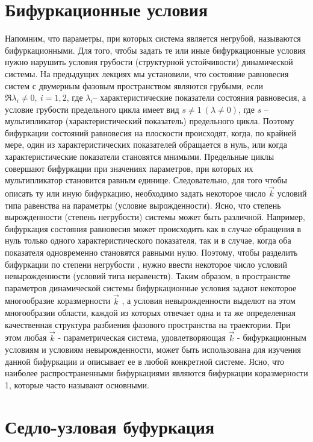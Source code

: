 \section{Бифуркационные условия}%
\label{sec:8.1}

Напомним, что параметры, при которых система является негрубой,
называются бифуркационными. Для того, чтобы задать те или иные
бифуркационные условия нужно нарушить условия грубости (структурной
устойчивости) динамической системы. На предыдущих лекциях мы
установили, что состояние равновесия систем с двумерным фазовым
пространством являются грубыми, если $\Re \lambda_i \neq 0,~ i=1,2$, где $\lambda_i$--
характеристические показатели состояния равновесия, а условие грубости
предельного цикла имеет вид $s\neq 1 ~ (\lambda \neq 0)$, где $s$ – мультипликатор
(характеристический показатель) предельного цикла. Поэтому бифуркации
состояний равновесия на плоскости происходят, когда, по крайней мере, один
из характеристических показателей обращается в нуль, или когда
характеристические показатели становятся мнимыми. Предельные циклы
совершают бифуркации при значениях параметров, при которых их
мультипликатор становится равным единице. Следовательно, для того чтобы
описать ту или иную бифуркацию, необходимо задать некоторое число $\vec k$
условий типа равенства на параметры (условие вырожденности). Ясно, что
степень вырожденности (степень негрубости) системы может быть различной.
Например, бифуркация состояния равновесия может происходить как в случае
обращения в нуль только одного характеристического показателя, так и в
случае, когда оба показателя одновременно становятся равными нулю.
Поэтому, чтобы разделить бифуркации по степени негрубости , нужно ввести
некоторое число условий невырожденности (условий типа неравенств). Таким
образом, в пространстве параметров динамической системы бифуркационные
условия задают некоторое многообразие коразмерности $\vec k$ , а условия
невырожденности выделют на этом многообразии области, каждой из которых
отвечает одна и та же определенная качественная структура разбиения
фазового пространства на траектории. При этом любая $\vec k$ - параметрическая
система, удовлетворяющая $\vec k$ - бифуркационным условиям и условиям
невырожденности, может быть использована для изучения данной бифуркации
и описывает ее в любой конкретной системе. Ясно, что наиболее
распространенными бифуркациями являются бифуркации коразмерности 1,
которые часто называют основными.

\section{Седло-узловая буфуркация}%
\label{sec:8.2}

